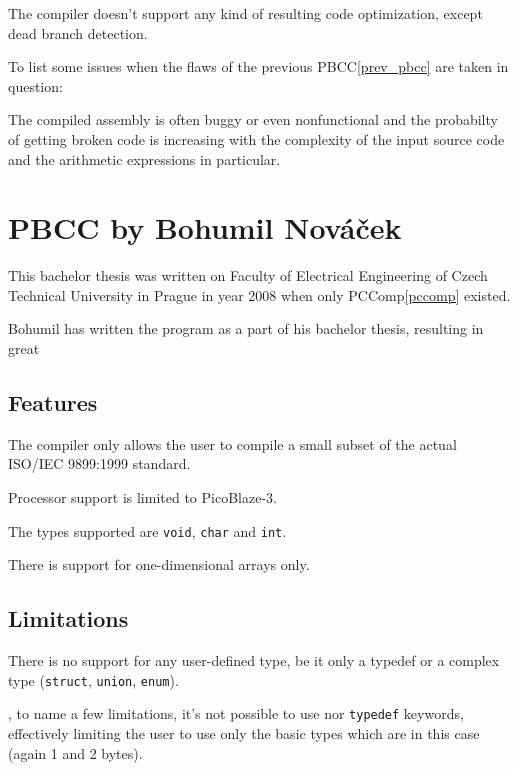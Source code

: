         The compiler doesn't support any kind of resulting code optimization, except dead branch detection.

        To list some issues when the flaws of the previous PBCC\ref{prev_pbcc} are taken in question:

        The compiled assembly is often buggy or even nonfunctional and the probabilty of getting broken code is increasing with the complexity of the input source code and the arithmetic expressions in particular.

    \section{PBCC by Bohumil Nováček}\label{not_quite_c}

    This bachelor thesis was written on Faculty of Electrical Engineering of Czech Technical University in Prague in year 2008 when only PCComp\ref{pccomp} existed.

    Bohumil has written the program as a part of his bachelor thesis, resulting in great 

        \subsection{Features}

        The compiler only allows the user to compile a small subset of the actual ISO/IEC 9899:1999 standard.

        Processor support is limited to PicoBlaze-3.

        The types supported are \texttt{void}, \texttt{char} and \texttt{int}.

        There is support for one-dimensional arrays only.

        \subsection{Limitations}

        There is no support for any user-defined type, be it only a typedef or a complex type (\texttt{struct}, \texttt{union}, \texttt{enum}).

    ,
    to name a few limitations, it's not possible to use
    nor \texttt{typedef} keywords,
    effectively limiting the user to use only the basic types which are in this case  (again 1 and 2 bytes).

